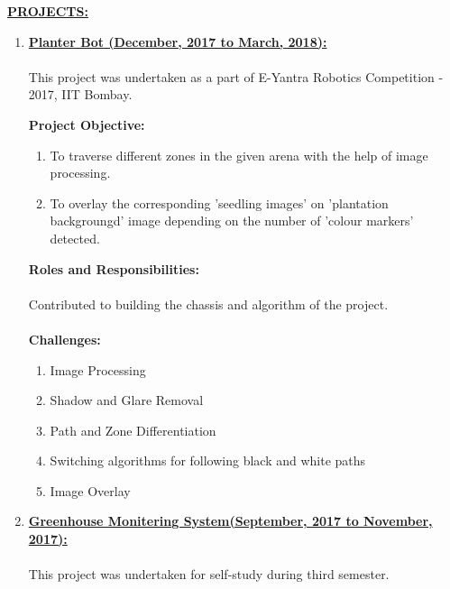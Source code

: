 \documentclass[letterpaper,11pt,oneside]{article}
\begin{document}
    \textbf{\underline{\Large PROJECTS:}} \begin{enumerate}
    	\item 
    	\textbf{\underline{\Large Planter Bot (December, 2017 to March, 2018):}}\\
    	\\
    	This project was undertaken as a part of E-Yantra Robotics Competition - 2017, IIT Bombay.
    	
    	\vspace{2ex}
    	
    	\textbf{\large Project Objective:} 
    	\begin{enumerate}
    		\item To traverse different zones in the given arena with the help of image processing.
    		\item To overlay the corresponding 'seedling images' on 'plantation backgroungd' image depending on the number of 'colour markers' detected.\\ 
    	\end{enumerate}
    	\textbf{\large Roles and Responsibilities:}\\
    	\\
    	Contributed to building the chassis and algorithm of the project.\\
    	\\
    	\textbf{\large Challenges:} 
    	\begin{enumerate}
    		\item Image Processing
    		\item Shadow and Glare Removal
    		\item Path and Zone Differentiation
    		\item Switching algorithms for following black and white paths
    		\item Image Overlay
    	\end{enumerate}
    	
    	\vspace{2ex}
    	
    	\item 
    	\textbf{\underline{\Large Greenhouse Monitering System(September, 2017 to November, 2017):}}\\
    	\\
    	This project was undertaken for self-study during third semester.
    	
    	\vspace{2ex}
    	

\end{enumerate}
\end{document}
